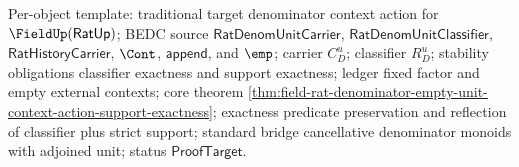 Per-object template: traditional target denominator context action for
$\FieldUp(\mathsf{RatUp})$; BEDC source $\mathsf{RatDenomUnitCarrier}$,
$\mathsf{RatDenomUnitClassifier}$, $\mathsf{RatHistoryCarrier}$, $\Cont$,
$\mathsf{append}$, and $\emp$; carrier $C_D^u$; classifier $R_D^u$; stability
obligations classifier exactness and support exactness; ledger fixed factor and
empty external contexts; core theorem
\autoref{thm:field-rat-denominator-empty-unit-context-action-support-exactness};
exactness predicate preservation and reflection of classifier plus strict
support; standard bridge cancellative denominator monoids with adjoined unit;
status $\mathsf{ProofTarget}$.
